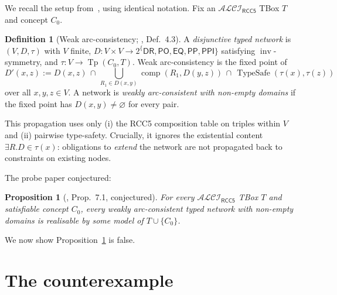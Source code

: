 \documentclass[11pt]{article}
\newtheorem{proposition}[theorem]{Proposition}
\theoremstyle{definition}
\newtheorem{definition}[theorem]{Definition}
\theoremstyle{remark}
\newcommand{\DR}{\mathsf{DR}}
\newcommand{\PO}{\mathsf{PO}}
\newcommand{\PP}{\mathsf{PP}}
\newcommand{\PPI}{\mathsf{PPI}}
\newcommand{\EQ}{\mathsf{EQ}}
\newcommand{\RCCall}{\{\DR,\PO,\EQ,\PP,\PPI\}}
\newcommand{\Tp}{\operatorname{Tp}}
\newcommand{\comp}{\operatorname{comp}}
\newcommand{\inv}{\operatorname{inv}}
\newcommand{\TypeSafe}{\operatorname{TypeSafe}}
\newcommand{\ALCIRCC}[1]{\mathcal{ALCI}_{\mathsf{RCC#1}}}
\begin{document}
We recall the setup from~\cite{PatchworkProbe}, using identical
notation.  Fix an $\ALCIRCC{5}$ TBox $T$ and concept $C_0$.

\begin{definition}[Weak arc-consistency; \cite{PatchworkProbe}, Def.~4.3]
\label{def:weak-ac}
A \emph{disjunctive typed network} is $(V, D, \tau)$ with
$V$ finite, $D : V \times V \to 2^\RCCall$ satisfying
$\inv$-symmetry, and $\tau : V \to \Tp(C_0, T)$.  Weak
arc-consistency is the fixed point of
\[
  D'(x, z) := D(x, z) \,\cap\,
  \bigcup_{R_1 \in D(x, y)} \comp(R_1, D(y, z))
  \,\cap\, \TypeSafe(\tau(x), \tau(z))
\]
over all $x, y, z \in V$.  A network is \emph{weakly arc-consistent
with non-empty domains} if the fixed point has $D(x, y) \neq
\varnothing$ for every pair.
\end{definition}

This propagation uses only (i) the RCC5 composition table on triples
within $V$ and (ii) pairwise type-safety.  Crucially, it ignores the
existential content $\exists R. D \in \tau(x)$: obligations to
\emph{extend} the network are not propagated back to constraints on
existing nodes.

The probe paper conjectured:

\begin{proposition}[\cite{PatchworkProbe}, Prop.~7.1, conjectured]
\label{prop:false}
For every $\ALCIRCC{5}$ TBox $T$ and satisfiable concept $C_0$,
every weakly arc-consistent typed network with non-empty domains
is realisable by some model of $T \cup \{C_0\}$.
\end{proposition}

We now show Proposition~\ref{prop:false} is false.

\section{The counterexample}
\label{sec:ce}
\end{document}
